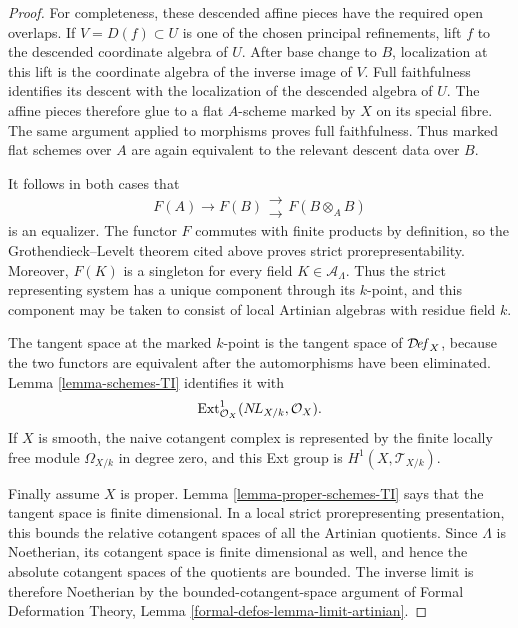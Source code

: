 \begin{proof}
For completeness, these descended affine pieces have the required open
overlaps. If $V = D(f) \subset U$ is one of the chosen principal refinements,
lift $f$ to the descended coordinate algebra of $U$. After base change to
$B$, localization at this lift is the coordinate algebra of the inverse image
of $V$. Full faithfulness identifies its descent with the localization of the
descended algebra of $U$. The affine pieces therefore glue to a flat
$A$-scheme marked by $X$ on its special fibre. The same argument applied to
morphisms proves full faithfulness. Thus marked flat schemes over $A$ are
again equivalent to the relevant descent data over $B$.

It follows in both cases that
$$
F(A) \longrightarrow F(B)
\mathrel{\substack{\longrightarrow \\[-0.6ex] \longrightarrow}}
F(B \otimes_A B)
$$
is an equalizer. The functor $F$ commutes with finite products by definition,
so the Grothendieck--Levelt theorem cited above proves strict
prorepresentability. Moreover, $F(K)$ is a singleton for every field
$K \in \mathcal{A}_\Lambda$. Thus the strict representing system has a unique
component through its $k$-point, and this component may be taken to consist of
local Artinian algebras with residue field $k$.

The tangent space at the marked $k$-point is the tangent space of
$\mathcal{D}\!\mathit{ef}_X$, because the two functors are equivalent after the
automorphisms have been eliminated. Lemma \ref{lemma-schemes-TI} identifies
it with
$$
\text{Ext}^1_{\mathcal{O}_X}(\mathop{N\!L}\nolimits_{X/k}, \mathcal{O}_X).
$$
If $X$ is smooth, the naive cotangent complex is represented by the finite
locally free module $\Omega_{X/k}$ in degree zero, and this Ext group is
$H^1(X, \mathcal{T}_{X/k})$.

Finally assume $X$ is proper. Lemma \ref{lemma-proper-schemes-TI} says that
the tangent space is finite dimensional. In a local strict prorepresenting
presentation, this bounds the relative cotangent spaces of all the Artinian
quotients. Since $\Lambda$ is Noetherian, its cotangent space is finite
dimensional as well, and hence the absolute cotangent spaces of the quotients
are bounded. The inverse limit is therefore Noetherian by the
bounded-cotangent-space argument of Formal Deformation Theory, Lemma
\ref{formal-defos-lemma-limit-artinian}.
\end{proof}

